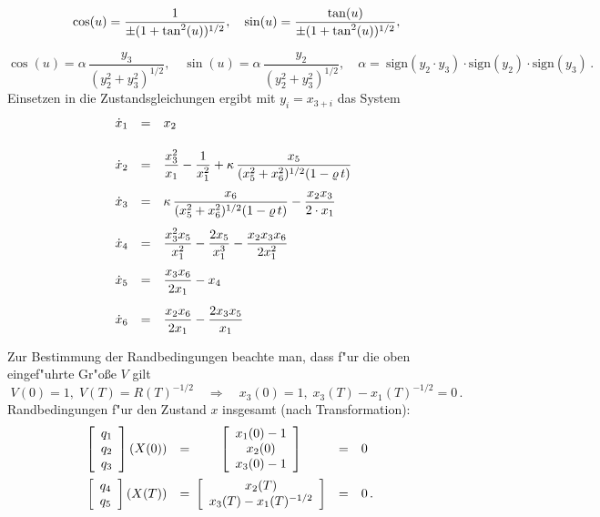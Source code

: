 \documentclass[12pt,a4paper,twoside,leqno]{article}
\begin{document}
\[
\displaystyle \cos (u) = \frac{1}  {\pm(1 + \tan^2(u))^{1/2}}, \quad
\sin (u) = \frac{\tan (u)}{\pm(1 + \tan^2(u))^{1/2}},
\]

\[
\cos (u) = \alpha \,\frac{y_3}{(y_2^2 + y_3^2)^{1/2}}, \quad
\sin (u) = \alpha \,\frac{y_2}{(y_2^2 + y_3^2)^{1/2}}, \quad
\alpha
= \: \mbox{sign}(y_2\cdot y_3)\cdot\mbox{sign}(y_2)\cdot\mbox{sign}(y_3)\,.
\]
%
Einsetzen in die
Zustandsgleichungen ergibt mit $y_i = x_{3+i}$ das System
%
\begin{equation} \label{e2.1}
\ba{.}{rcl}
\dot{x}_1 &=& x_2\\[5mm]
%
\dot{x}_2 &=& \dis \frac{x_3^2}{x_1} - \frac{1}{x_1^2}
+ \kappa \,\frac{x_5}{(x_5^2 + x_6^2)^{1/2}(1 - \rho \, t)}\\[5mm]
%
\dot{x}_3 &=& \dis \kappa \,\frac{x_6}{(x_5^2 + x_6^2)^{1/2}(1 - \rho \,t)}
- \frac{x_2x_3}{2 \cdot x_1}\\[5mm]
%
\dot{x}_4 &=& \dis \frac{x_3^2x_5}{x_1^2} - \frac{2x_5}{x_1^3}
                   -\frac{x_2x_3x_6}{2x_1^2}\\[5mm]
\dot{x}_5 &=& \dis \frac{x_3x_6}{2x_1} - x_4\\[5mm]
\dot{x}_6 &=& \dis \frac{x_2x_6}{2x_1} - \frac{2x_3x_5}{x_1}
\ea{.}
\end{equation}

Zur Bestimmung der Randbedingungen beachte man,
dass f"ur die oben eingef"uhrte Gr"o\ss e $V$ gilt
%
\[
V(0) = 1, \; V(T) = R(T)^{-1/2}
\quad \Longrightarrow \quad
x_3(0) = 1, \; x_3(T) - x_1(T)^{-1/2} = 0\, .
\]
Randbedingungen f"ur den Zustand $x$ insgesamt (nach Transformation):
\begin{equation} \label{e2.2}
\ba{.}{rcccl}
\ba{[}{c}q_1\\q_2\\q_3\ea{]}(X(0)) &=&
\ba{[}{c} x_1(0) - 1\\ x_2(0)\\ x_3(0) - 1\ea{]} &=& 0\\[6mm]
%
\ba{[}{c}q_4\\q_5\ea{]}(X(T)) &=&
\ba{[}{c} x_2(T)\\x_3(T) - x_1(T)^{-1/2} \ea{]} &=& 0\, .
\ea{.}
\end{equation}
\end{document}
